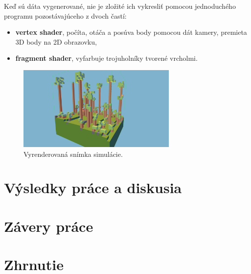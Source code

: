 \documentclass[12pt]{article}
\begin{document}
Keď sú dáta vygenerované, nie je zložité ich vykresliť pomocou jednoduchého
programu pozostávajúceho z dvoch častí:

\begin{itemize}
	\item \textbf{vertex shader}, počíta, otáča a posúva body pomocou dát kamery,
	      premieta 3D body na 2D obrazovku,
	\item \textbf{fragment shader}, vyfarbuje trojuholníky tvorené vrcholmi.
\end{itemize}

\begin{figure}[ht]
	\centering
	\includegraphics[width=0.7\textwidth]{res/screenshot.png}
	\caption{Vyrenderovaná snímka simulácie.}
\end{figure}


\section{Výsledky práce a diskusia}
\section{Závery práce}
\section{Zhrnutie}

\nocite{*} %
\renewcommand{\refname}{Zoznam použitej literatúry}

\end{document}
